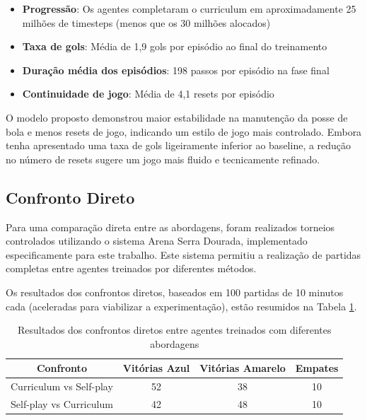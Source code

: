 \begin{itemize}
    \item \textbf{Progressão}: Os agentes completaram o curriculum em aproximadamente 25 milhões de timesteps (menos que os 30 milhões alocados)
    \item \textbf{Taxa de gols}: Média de 1,9 gols por episódio ao final do treinamento
    \item \textbf{Duração média dos episódios}: 198 passos por episódio na fase final
    \item \textbf{Continuidade de jogo}: Média de 4,1 resets por episódio
\end{itemize}

O modelo proposto demonstrou maior estabilidade na manutenção da posse de bola e menos resets de jogo, indicando um estilo de jogo mais controlado. Embora tenha apresentado uma taxa de gols ligeiramente inferior ao baseline, a redução no número de resets sugere um jogo mais fluido e tecnicamente refinado.

\subsection{Confronto Direto}

Para uma comparação direta entre as abordagens, foram realizados torneios controlados utilizando o sistema Arena Serra Dourada, implementado especificamente para este trabalho. Este sistema permitiu a realização de partidas completas entre agentes treinados por diferentes métodos.

Os resultados dos confrontos diretos, baseados em 100 partidas de 10 minutos cada (aceleradas para viabilizar a experimentação), estão resumidos na Tabela \ref{tab:confrontos_diretos}.

\begin{table}[H]
    \centering
    \begin{tabular}{|c|c|c|c|}
        \hline
        \textbf{Confronto} & \textbf{Vitórias Azul} & \textbf{Vitórias Amarelo} & \textbf{Empates} \\
        \hline
        Curriculum vs Self-play & 52 & 38 & 10 \\
        Self-play vs Curriculum & 42 & 48 & 10 \\
        \hline
    \end{tabular}
    \caption{Resultados dos confrontos diretos entre agentes treinados com diferentes abordagens}
    \label{tab:confrontos_diretos}
\end{table}

